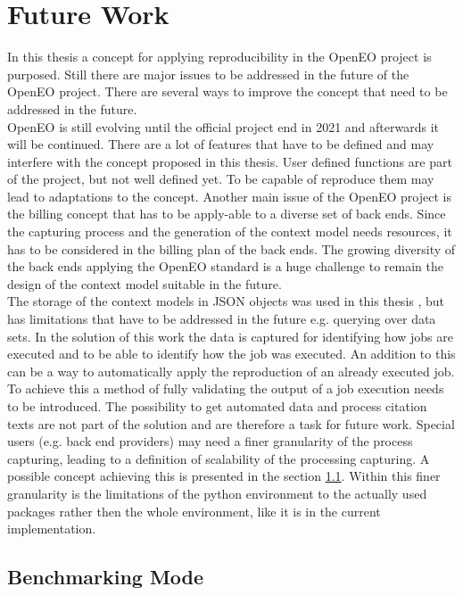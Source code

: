 \documentclass[draft,final]{vutinfth} %
\begin{document}
\section{Future Work}\label{FutureWork}
In this thesis a concept for applying reproducibility in the OpenEO project is purposed. Still there are major issues to be addressed in the future of the OpenEO project. There are several ways to improve the concept that need to be addressed in the future. \\
OpenEO is still evolving until the official project end in 2021 and afterwards it will be continued. There are a lot of features that have to be defined and may interfere with the concept proposed in this thesis. User defined functions are part of the project, but not well defined yet. To be capable of reproduce them may lead to adaptations to the concept. Another main issue of the OpenEO project is the billing concept that has to be apply-able to a diverse set of back ends. Since the capturing process and the generation of the context model needs resources, it has to be considered in the billing plan of the back ends. The growing diversity of the back ends applying the OpenEO standard is a huge challenge to remain the design of the context model suitable in the future. \\
The storage of the context models in JSON objects was used in this thesis , but has limitations that have to be addressed in the future e.g. querying over data sets. 
In the solution of this work the data is captured for identifying how jobs are executed and to be able to identify how the job was executed. An addition to this can be a way to automatically apply the reproduction of an already executed job. To achieve this a method of fully validating the output of a job execution needs to be introduced. The possibility to get automated data and process citation texts are not part of the solution and are therefore a task for future work. Special users (e.g. back end providers) may need a finer granularity of the process capturing, leading to a definition of scalability of the processing capturing. A possible concept achieving this is presented in the section \ref{Job:Benchmarking}. Within this finer granularity is the limitations of the python environment to the actually used packages rather then the whole environment, like it is in the current implementation.       

\subsection{Benchmarking Mode}\label{Job:Benchmarking}
\end{document}

